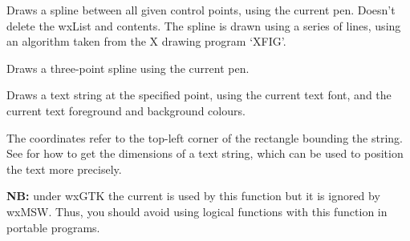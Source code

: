 
Draws a spline between all given control points, using the current
pen.  Doesn't delete the wxList and contents. The spline is drawn
using a series of lines, using an algorithm taken from the X drawing
program `XFIG'.


Draws a three-point spline using the current pen.




\label{wxdcdrawtext}


Draws a text string at the specified point, using the current text font,
and the current text foreground and background colours.

The coordinates refer to the top-left corner of the rectangle bounding
the string. See  for how
to get the dimensions of a text string, which can be used to position the
text more precisely.

{\bf NB:} under wxGTK the current 
 is used by this function
but it is ignored by wxMSW. Thus, you should avoid using logical functions
with this function in portable programs.

\begin{comment}

\membersection{wxDC::EnableCache}\label{wxdcenablecache}

\func{static void}{EnableCache}{\param{bool}{ enableCache}}

On supported platforms (currently only Windows), enables the DC cache
which can speed up the \helpref{Blit}{wxdcblit} operation when
drawing a large number of masked bitmaps.

If using the cache functions in your code, please test for the
wxUSE\_DC\_CACHEING preprocessor symbol for portability.

\wxheading{See also}

\helpref{wxDC::CacheEnabled}{wxdccacheenabled}, \helpref{wxDC::ClearCache}
\end{comment}


